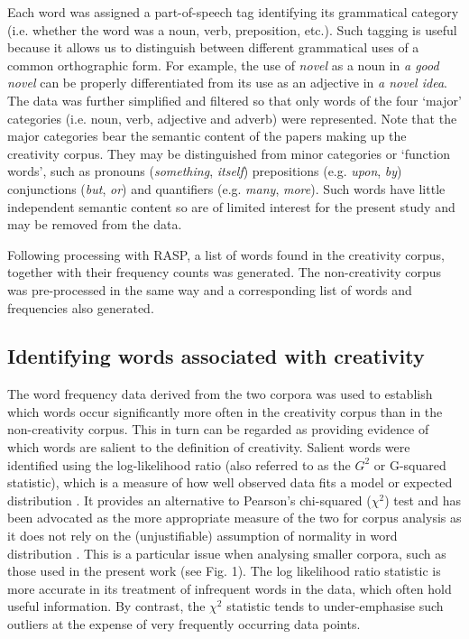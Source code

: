 \documentclass[10pt,letterpaper]{article}
\begin{document}
Each word was assigned a part-of-speech tag identifying its grammatical category (i.e. whether the word was a noun, verb, preposition, etc.). Such tagging is useful because it allows us to distinguish between different grammatical uses of a common orthographic form. For example, the use of {\em novel\/} as a noun in {\em a good novel\/} can be properly differentiated from its use as an adjective in {\em a novel idea\/}.  The data was further simplified and filtered so that only words of the four `major' categories (i.e. noun, verb, adjective and adverb) were represented. Note that the major categories bear the semantic content of the papers making up the creativity corpus. They may be distinguished from minor categories or `function words', such as pronouns ({\em something\/}, {\em itself\/}) prepositions (e.g. {\em upon\/}, {\em by\/}) conjunctions ({\em but\/}, {\em or\/}) and quantifiers (e.g. {\em many\/}, {\em more\/}). Such words have little independent semantic content so are of limited interest for the present study and may be removed from the data.  

Following processing with RASP, a list of words found in the creativity corpus, together with their frequency counts was generated. The non-creativity corpus was pre-processed in the same way and a corresponding list of words and frequencies also generated. 


\subsection*{Identifying words associated with creativity}

The word frequency data derived from the two corpora was used to establish which words occur significantly more often in the creativity corpus than in the non-creativity corpus. This in turn can be regarded as providing evidence of which words are salient to the definition of creativity. Salient words were identified using the log-likelihood ratio  (also referred to as the $G^2$ or G-squared statistic), which is a measure of how well observed data fits a model or expected distribution \cite{dunning93,kilgarriff01,rayson00,oakes98}. It provides an alternative to Pearson's chi-squared ($\chi^2$) test and has been advocated as the more appropriate measure of the two for corpus analysis as it does not rely on the (unjustifiable) assumption of normality in word distribution  \cite{dunning93,kilgarriff01,oakes98}. This is a particular issue when analysing smaller corpora, such as those used in the present work (see Fig. 1). %
The log likelihood ratio statistic is more accurate in its treatment of infrequent words in the data,  which often hold useful information. By contrast, the $\chi^2$ statistic tends to under-emphasise such outliers at the expense of very frequently occurring data points.
\end{document}
